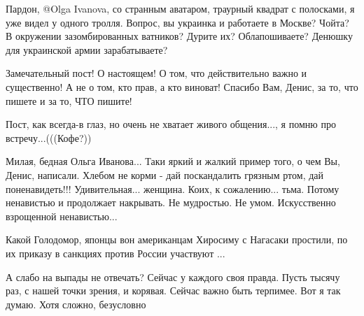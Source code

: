 \begin{itemize}

Пардон, @Olga Ivanova, со странным аватаром, траурный квадрат с полосками, я
уже видел у одного тролля. Вопрос, вы украинка и работаете в Москве? Чойта? В
окружении зазомбированных ватников? Дурите их? Облапошиваете? Денюшку для
украинской армии зарабатываете?


Замечательный пост! О настоящем! О том, что действительно важно и существенно!
А не о том, кто прав, а кто виноват! Спасибо Вам, Денис, за то, что пишете и за
то, ЧТО пишите!


Пост, как всегда-в глаз, но очень не хватает живого общения..., я помню про
встречу...(((Кофе?))


Милая, бедная Ольга Иванова... Таки яркий и жалкий пример того, о чем Вы,
Денис, написали. Хлебом не корми - дай поскандалить грязным ртом, дай
поненавидеть!!! Удивительная... женщина. Коих, к сожалению... тьма. Потому
ненавистью и продолжает накрывать. Не мудростью. Не умом. Искусственно
взрощенной ненавистью...


Какой Голодомор, японцы вон американцам Хиросиму с Нагасаки простили, по их приказу в санкциях против России участвуют ...


А слабо на выпады не отвечать? Сейчас у каждого своя правда. Пусть тысячу раз,
с нашей точки зрения, и корявая. Сейчас важно быть терпимее. Вот я так думаю.
Хотя сложно, безусловно



\end{itemize}
